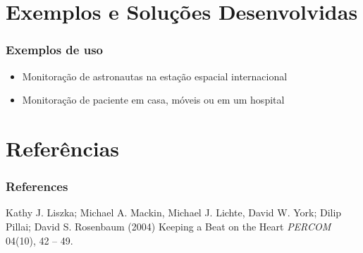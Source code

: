 \documentclass{beamer}
\begin{document}
\section{Exemplos e Soluções Desenvolvidas}

\begin{frame}
\frametitle{Exemplos de uso}

	\begin{itemize}
		\item Monitoração de astronautas na estação espacial internacional
		\item Monitoração de paciente em casa, móveis ou em um hospital
	\end{itemize}
\end{frame}

\section{Referências}

\begin{frame}
\frametitle{References}
\footnotesize{
\begin{thebibliography}{99}
 Kathy J. Liszka; Michael A. Mackin, Michael J. Lichte, David W. York; Dilip Pillai; David S. Rosenbaum (2004)
\newblock Keeping a Beat on the Heart
\newblock \emph{PERCOM} 04(10), 42 -- 49.
\end{thebibliography}
}
\end{frame}



\begin{frame}
\titlepage %
\end{frame}

\end{document}
